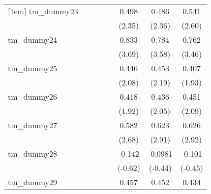 {\begin{tabular}{l*{7}{c}}
[1em]
tm\_dummy23  &                     &                     &                     &                     &       0.498\sym{*}  &       0.486\sym{*}  &       0.541\sym{**} \\
            &                     &                     &                     &                     &      (2.35)         &      (2.36)         &      (2.60)         \\
[1em]
tm\_dummy24  &                     &                     &                     &                     &       0.833\sym{***}&       0.784\sym{***}&       0.762\sym{***}\\
            &                     &                     &                     &                     &      (3.69)         &      (3.58)         &      (3.46)         \\
[1em]
tm\_dummy25  &                     &                     &                     &                     &       0.446\sym{*}  &       0.453\sym{*}  &       0.407         \\
            &                     &                     &                     &                     &      (2.08)         &      (2.19)         &      (1.93)         \\
[1em]
tm\_dummy26  &                     &                     &                     &                     &       0.418         &       0.436\sym{*}  &       0.451\sym{*}  \\
            &                     &                     &                     &                     &      (1.92)         &      (2.05)         &      (2.09)         \\
[1em]
tm\_dummy27  &                     &                     &                     &                     &       0.582\sym{**} &       0.623\sym{**} &       0.626\sym{**} \\
            &                     &                     &                     &                     &      (2.68)         &      (2.91)         &      (2.92)         \\
[1em]
tm\_dummy28  &                     &                     &                     &                     &      -0.142         &     -0.0981         &      -0.101         \\
            &                     &                     &                     &                     &     (-0.62)         &     (-0.44)         &     (-0.45)         \\
[1em]
tm\_dummy29  &                     &                     &                     &                     &       0.457\sym{*}  &       0.452\sym{*}  &       0.434\sym{*}  \\

\end{tabular}}
